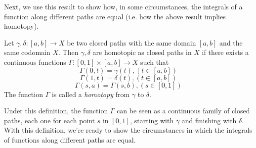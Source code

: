 Next, we use this result to show how, in some circumstances, the integrals of a
function along different paths are equal (i.e. how the above result implies
homotopy).
\begin{definition}
  Let $\gamma,\delta:[a,b]\to X$ be two closed paths with the same domain
  $[a,b]$ and the same codomain $X$. Then $\gamma,\delta$ are homotopic as
  closed paths in $X$ if there exists a continuous functions
  $\Gamma:[0,1]\times [a,b]\to X$ such that
  \[\Gamma(0,t)= \gamma(t), (t\in[a,b])\]
  \[\Gamma(1,t)= \delta(t), (t\in[a,b])\]
  \[\Gamma(s,a)= \Gamma(s,b), (s\in[0,1])\]
  The function $\Gamma$ is called a \emph{homotopy} from $\gamma$ to $\delta$.
  \label{def:homotopy}
\end{definition}
Under this definition, the function $\Gamma$ can be seen as a continuous family
of  closed paths, each one for each point $s$ in $[0,1]$, starting with $\gamma$
and finishing with $\delta$. With this definition, we're ready to show the
circumstances in which the integrals of functions along different paths are
equal.

